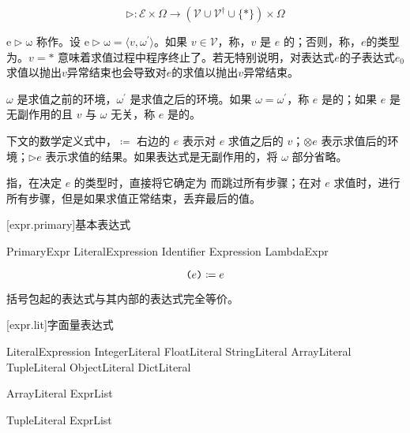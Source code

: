 $$ \mathrm{\rhd}: \mathcal{E} \times \Omega \rightarrow (\mathcal{V} \cup \mathcal{V}^\dag \cup \{\ast\}) \times \Omega $$

\pnum
$\mathrm{e \rhd \omega}$ 称作。设 $\mathrm{e \rhd \omega} = \langle v, \omega^\prime \rangle$。如果 $v \in \mathcal{V}$，称，$v$ 是 $e$ 的；否则，称，$e$的类型为。$v = \ast$ 意味着求值过程中程序终止了。若无特别说明，对表达式$e$的子表达式$e_0$求值以抛出$v$异常结束也会导致对$e$的求值以抛出$v$异常结束。

\pnum
$\omega$ 是求值之前的环境，$\omega^\prime$ 是求值之后的环境。如果 $\omega = \omega^\prime$，称 $e$ 是的；如果 $e$ 是无副作用的且 $v$ 与 $\omega$ 无关，称 $e$ 是的。

\pnum
下文的数学定义式中，$\coloneqq$ 右边的 $e$ 表示对 $e$ 求值之后的 $v$；$\otimes e$ 表示求值后的环境；$\rhd e$ 表示求值的结果。如果表达式是无副作用的，将 $\omega$ 部分省略。

\pnum
{}指，在决定 $e$ 的类型时，直接将它确定为  而跳过所有步骤；在对 $e$ 求值时，进行所有步骤，但是如果求值正常结束，丢弃最后的值。

[expr.primary]{基本表达式}

\begin{bnf}{PrimaryExpr}
    LiteralExpression \br
    Identifier \br
    \terminal{(} Expression \terminal{)} \br
    LambdaExpr
\end{bnf}

$$ \texttt{(}e\texttt{)} \coloneqq e $$

\pnum
括号包起的表达式与其内部的表达式完全等价。

[expr.lit]{字面量表达式}

\begin{bnf}{LiteralExpression}
    IntegerLiteral \br
    FloatLiteral \br
    StringLiteral \br
     \br
     \br
     \br
    \terminal{()} \br
    ArrayLiteral \br
    TupleLiteral \br
    ObjectLiteral \br
    DictLiteral \br
\end{bnf}

\begin{bnf}{ArrayLiteral}
    \terminal{[} ExprList\bnfq \terminal{]}
\end{bnf}

\begin{bnf}{TupleLiteral}
    \terminal{(} ExprList\bnfq \terminal{)}
\end{bnf}


